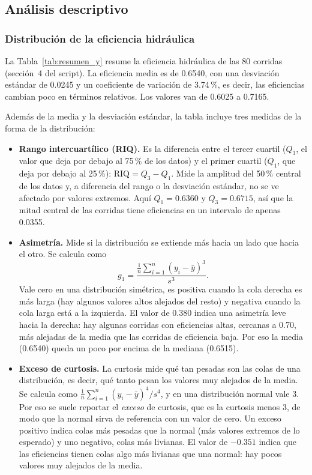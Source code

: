 
\subsection{Análisis descriptivo}
\label{sec:descriptivo}

\subsubsection{Distribución de la eficiencia hidráulica}

La Tabla~\ref{tab:resumen_y} resume la eficiencia hidráulica de las 80 corridas (sección~4 del script). La eficiencia media es de 0.6540, con una desviación estándar de 0.0245 y un coeficiente de variación de 3.74\,\%, es decir, las eficiencias cambian poco en términos relativos. Los valores van de 0.6025 a 0.7165.

Además de la media y la desviación estándar, la tabla incluye tres medidas de la forma de la distribución:

\begin{itemize}
  \item \textbf{Rango intercuartílico (RIQ).} Es la diferencia entre el tercer cuartil ($Q_3$, el valor que deja por debajo al 75\,\% de los datos) y el primer cuartil ($Q_1$, que deja por debajo al 25\,\%): $\text{RIQ} = Q_3 - Q_1$. Mide la amplitud del 50\,\% central de los datos y, a diferencia del rango o la desviación estándar, no se ve afectado por valores extremos. Aquí $Q_1 = 0.6360$ y $Q_3 = 0.6715$, así que la mitad central de las corridas tiene eficiencias en un intervalo de apenas 0.0355.

  \item \textbf{Asimetría.} Mide si la distribución se extiende más hacia un lado que hacia el otro. Se calcula como
  \[
  g_1 = \frac{\frac{1}{n}\sum_{i=1}^{n}(y_i-\bar{y})^3}{s^3}.
  \]
  Vale cero en una distribución simétrica, es positiva cuando la cola derecha es más larga (hay algunos valores altos alejados del resto) y negativa cuando la cola larga está a la izquierda. El valor de 0.380 indica una asimetría leve hacia la derecha: hay algunas corridas con eficiencias altas, cercanas a 0.70, más alejadas de la media que las corridas de eficiencia baja. Por eso la media (0.6540) queda un poco por encima de la mediana (0.6515).

  \item \textbf{Exceso de curtosis.} La curtosis mide qué tan pesadas son las colas de una distribución, es decir, qué tanto pesan los valores muy alejados de la media. Se calcula como $\frac{1}{n}\sum_{i=1}^{n}(y_i-\bar{y})^4 / s^4$, y en una distribución normal vale 3. Por eso se suele reportar el \emph{exceso} de curtosis, que es la curtosis menos 3, de modo que la normal sirva de referencia con un valor de cero. Un exceso positivo indica colas más pesadas que la normal (más valores extremos de lo esperado) y uno negativo, colas más livianas. El valor de $-0.351$ indica que las eficiencias tienen colas algo más livianas que una normal: hay pocos valores muy alejados de la media.
\end{itemize}

